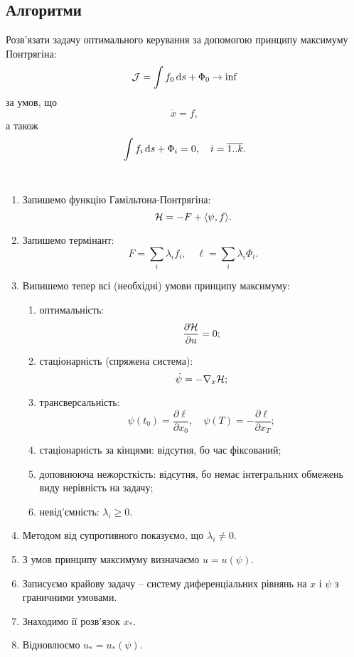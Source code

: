 \subsection{Алгоритми}

\begin{problem*}
	Розв'язати задачу оптимального керування за допомогою принципу максимуму Понтрягіна: \[ \mathcal{J}  = \int f_0 \mathop{}\!\mathrm{d} s + \Phi_0 \to \inf \] за умов, що \[ \dot x = f, \] а також \[ \int f_i \mathop{}\!\mathrm{d} s + \Phi_i = 0 , \quad i = \overline{1..k}. \]
\end{problem*}

\begin{algorithm} \tt
	\begin{enumerate}
		\item Запишемо функцію Гамільтона-Понтрягіна: \[ \mathcal{H} = -F + \langle \psi, f \rangle. \]
		\item Запишемо термінант: \[ F = \sum_i \lambda_i f_i, \quad \ell = \sum_i \lambda_i \Phi_i. \]
		\item Випишемо тепер всі (необхідні) умови принципу максимуму:
		\begin{enumerate}
			\item оптимальність: \[\frac{\partial \mathcal{H}}{\partial u} = 0;\]
			\item стаціонарність (спряжена система): \[\dot \psi = - \nabla_x \mathcal{H};\]
			\item трансверсальність: \[\psi(t_0) = \frac{\partial \ell}{\partial x_0}, \quad \psi(T) = - \frac{\partial \ell}{\partial x_T};\]
			\item стаціонарність за кінцями: відсутня, бо час фіксований;
			\item доповнююча нежорсткість: відсутня, бо немає інтегральних \allowbreak об\-ме\-жень виду нерівність на задачу;
			\item невід'ємність: $\lambda_i \ge 0$.
		\end{enumerate}
		\item Методом від супротивного показуємо, що $\lambda_i \ne 0$.
		\item З умов принципу максимуму визначаємо $u = u(\psi)$.
		\item Записуємо крайову задачу -- систему диференціальних рівнянь на $x$ і $\psi$ з граничними умовами.
		\item Знаходимо її розв'язок $x_*$.
		\item Відновлюємо $u_* = u_*(\psi)$.
	\end{enumerate}
\end{algorithm}

